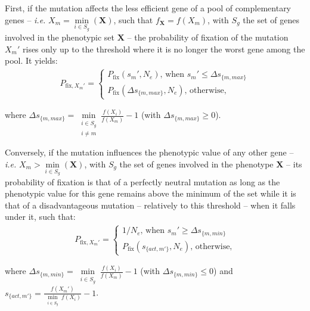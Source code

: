  First, if the mutation affects the less efficient gene of a pool of complementary genes -- \textit{i.e.} $X_{m}=\min \limits_{i \in S_g} (\mathbf{X})$, such that $f_{\mathbf{X}}=f(X_m)$, with $S_g$ the set of genes involved in the phenotypic set $\mathbf{X}$ -- the probability of fixation of the mutation $X_m'$ rises only up to the threshold where it is no longer the worst gene among the pool. It yields:
 \begin{align}
     P_{\text{fix},X_{m}'} = \left\{
    \begin{array}{ll}
        P_{\text{fix}}(s_m',N_e)\text{, when $s_m'$} \leq \Delta s_{\{m,max\}} \\
        P_{\text{fix}}(\Delta s_{\{m,max\}},N_e)\text{, otherwise,}
    \end{array}
\right.
\label{eq:Pfix_compepi1}
 \end{align}
 
where $\Delta s_{\{m,max\}}=\min \limits_{\substack{i \in S_g \\ i\neq m}} \frac{f(X_i)}{f(X_m)} - 1$ (with $\Delta s_{\{m,max\}} \geq 0$). 

Conversely, if the mutation influences the phenotypic value of any other gene -- \textit{i.e.} $X_{m}>\min \limits_{i \in S_g} (\mathbf{X})$, with $S_g$ the set of genes involved in the phenotype $\mathbf{X}$ -- its probability of fixation is that of a perfectly neutral mutation as long as the phenotypic value for this gene remains above the minimum of the set while it is that of a disadvantageous mutation -- relatively to this threshold -- when it falls under it, such that:
 \begin{align}
     P_{\text{fix},X_{m}'} = \left\{
    \begin{array}{ll}
        1/N_e\text{, when $s_m'$} \geq \Delta s_{\{m,min\}} \\
        P_{\text{fix}}(s_{\{act,m'\}},N_e)\text{, otherwise,}
    \end{array}
\right.
\label{eq:Pfix_compepi2}
 \end{align}
 
where $\Delta s_{\{m,min\}}=\min \limits_{\substack{i \in S_g}} \frac{f(X_i)}{f(X_m)} - 1$ (with $\Delta s_{\{m,min\}} \leq 0$) and $s_{\{act,m'\}}=\frac{f(X_m')}{\min \limits_{\substack{i \in S_g}} f(X_i)}-1$.\\

